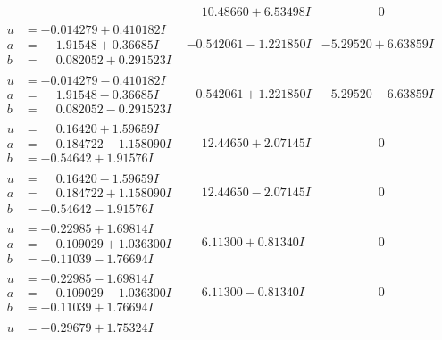 \documentclass[1p]{elsarticle_modified}
\theoremstyle{definition}
\begin{document}
$$\begin{array}{c|c|c}
 & \phantom{-}10.48660 + 6.53498 I & \phantom{-0.000000 } 0 \\ \hline\begin{aligned}
u &= -0.014279 + 0.410182 I \\
a &= \phantom{-}1.91548 + 0.36685 I \\
b &= \phantom{-}0.082052 + 0.291523 I\end{aligned}
 & -0.542061 - 1.221850 I & -5.29520 + 6.63859 I \\ \hline\begin{aligned}
u &= -0.014279 - 0.410182 I \\
a &= \phantom{-}1.91548 - 0.36685 I \\
b &= \phantom{-}0.082052 - 0.291523 I\end{aligned}
 & -0.542061 + 1.221850 I & -5.29520 - 6.63859 I \\ \hline\begin{aligned}
u &= \phantom{-}0.16420 + 1.59659 I \\
a &= \phantom{-}0.184722 - 1.158090 I \\
b &= -0.54642 + 1.91576 I\end{aligned}
 & \phantom{-}12.44650 + 2.07145 I & \phantom{-0.000000 } 0 \\ \hline\begin{aligned}
u &= \phantom{-}0.16420 - 1.59659 I \\
a &= \phantom{-}0.184722 + 1.158090 I \\
b &= -0.54642 - 1.91576 I\end{aligned}
 & \phantom{-}12.44650 - 2.07145 I & \phantom{-0.000000 } 0 \\ \hline\begin{aligned}
u &= -0.22985 + 1.69814 I \\
a &= \phantom{-}0.109029 + 1.036300 I \\
b &= -0.11039 - 1.76694 I\end{aligned}
 & \phantom{-}6.11300 + 0.81340 I & \phantom{-0.000000 } 0 \\ \hline\begin{aligned}
u &= -0.22985 - 1.69814 I \\
a &= \phantom{-}0.109029 - 1.036300 I \\
b &= -0.11039 + 1.76694 I\end{aligned}
 & \phantom{-}6.11300 - 0.81340 I & \phantom{-0.000000 } 0 \\ \hline\begin{aligned}
u &= -0.29679 + 1.75324 I \\

\end{aligned}
\end{array}$$
\end{document}
